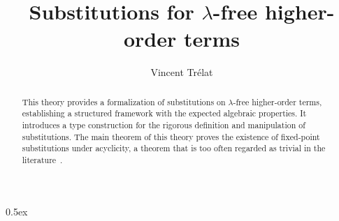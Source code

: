 \documentclass[11pt,a4paper]{article}
\title{Substitutions for $\lambda$-free higher-order terms}
\author{Vincent Trélat}
\begin{document}
\maketitle

\begin{abstract}
  This theory provides a formalization of substitutions on $\lambda$-free higher-order terms,
  establishing a structured framework with the expected algebraic properties.
  It introduces a type construction for the rigorous definition and manipulation of substitutions.
  The main theorem of this theory proves the existence of fixed-point substitutions under acyclicity,
  a theorem that is too often regarded as trivial in the literature~\cite{BarbosaFR17,TourretFOB20}.
\end{abstract}

\tableofcontents
\pagebreak

\parindent 0pt\parskip 0.5ex





\end{document}
